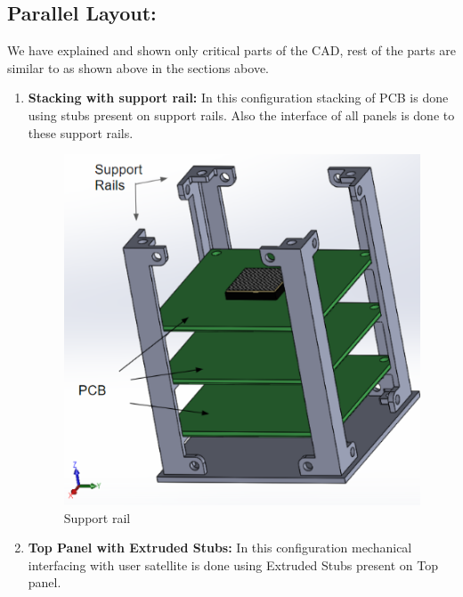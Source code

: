 \documentclass[../../main.tex]{subfiles}
\begin{document}
    \subsection{ \textbf{Parallel Layout:}}
    \text We have explained and shown only critical parts of the CAD, rest of the parts are similar to as shown above in the sections above.
    \begin{enumerate}
        \item \textbf{Stacking with support rail:} In this configuration stacking of PCB is done using stubs present on support rails. Also the interface of all panels is done to these support rails.
        \begin{figure}[H]
        \centering
        \includegraphics[scale=0.75]{Figures/Mechanical/support_stack.png}
        \caption{Support rail}
        \label{fig:sys_CAD}
    \end{figure}
        \item \textbf{Top Panel with Extruded Stubs:} In this configuration mechanical interfacing with user satellite is done using Extruded Stubs present on Top panel.
        \begin{figure}[H]
            \centering

\end{figure}
\end{enumerate}
\end{document}
